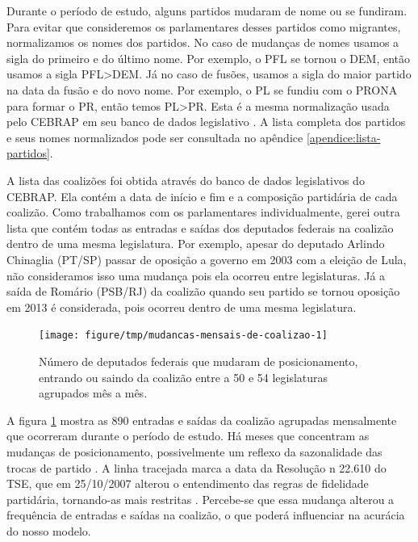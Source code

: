 \documentclass[a4paper,titlepage]{ppgi}\usepackage[]{graphicx}\usepackage[]{color}
\newenvironment{knitrout}{}{} %
\begin{document}
Durante o período de estudo, alguns partidos mudaram de nome ou se fundiram.
Para evitar que consideremos os parlamentares desses partidos como migrantes,
normalizamos os nomes dos partidos. No caso de mudanças de nomes usamos a sigla
do primeiro e do último nome. Por exemplo, o PFL se tornou o DEM, então usamos
a sigla PFL>DEM. Já no caso de fusões, usamos a sigla do maior partido na data
da fusão e do novo nome. Por exemplo, o PL se fundiu com o PRONA para formar o
PR, então temos PL>PR. Esta é a mesma normalização usada pelo \gls{CEBRAP} em
seu banco de dados legislativo \cite{Freitas2008}. A lista completa dos
partidos e seus nomes normalizados pode ser consultada no apêndice
\ref{apendice:lista-partidos}.

A lista das coalizões foi obtida através do banco de dados
legislativos do \gls{CEBRAP}. Ela contém a data de início e fim e a composição
partidária de cada coalizão. Como trabalhamos com os parlamentares
individualmente, gerei outra lista que contém todas as entradas e saídas dos
deputados federais na coalizão dentro de uma mesma legislatura. Por exemplo,
apesar do deputado Arlindo Chinaglia (PT/SP) passar de oposição a governo
em 2003 com a eleição de Lula, não consideramos isso uma mudança pois ela
ocorreu entre legislaturas. Já a saída de Romário (PSB/RJ) da coalizão quando
seu partido se tornou oposição em 2013 é considerada, pois ocorreu dentro de
uma mesma legislatura.

\begin{knitrout}
\color{fgcolor}\begin{figure}
\texttt{[image: figure/tmp/mudancas-mensais-de-coalizao-1]} \caption[Número de deputados federais que mudaram de posicionamento, entrando ou saindo da coalizão entre a 50\textordfeminine{} e 54\textordfeminine{} legislaturas agrupados mês a mês]{Número de deputados federais que mudaram de posicionamento, entrando ou saindo da coalizão entre a 50\textordfeminine{} e 54\textordfeminine{} legislaturas agrupados mês a mês.}\label{fig:mudancas-mensais-de-coalizao}
\end{figure}


\end{knitrout}

A figura \ref{fig:mudancas-mensais-de-coalizao} mostra as
890 entradas e saídas da coalizão agrupadas
mensalmente que ocorreram durante o período de estudo. Há meses que concentram
as mudanças de posicionamento, possivelmente um reflexo da sazonalidade das
trocas de partido \cite{Araujo2000,Melo2004,Freitas2008}. A linha tracejada
marca a data da Resolução n\textordmasculine{} 22.610 do TSE, que em
25/10/2007 alterou o entendimento das
regras de fidelidade partidária, tornando-as mais restritas \cite{TSE2007}.
Percebe-se que essa mudança alterou a frequência de entradas e saídas na
coalizão, o que poderá influenciar na acurácia do nosso modelo.
\end{document}
